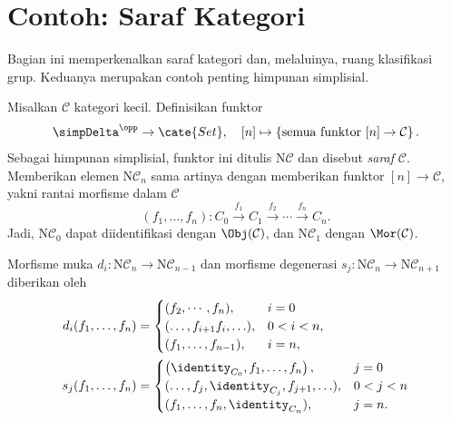 
\section{Contoh: Saraf Kategori}\label{sec:nerves}
\hypertarget{o014.aljabr2.chapter8.nerves-of-categories}{ }
Bagian ini memperkenalkan saraf kategori dan, melaluinya, ruang klasifikasi
grup. Keduanya merupakan contoh penting himpunan simplisial.

\begin{example}\label{eg:nerve-cat}
	Misalkan $\mathcal{C}$ kategori kecil. Definisikan funktor
	\[ \simpDelta^{\opp} \to \cate{Set}, \quad [n] \mapsto \left\{ \text{semua funktor } [n] \to \mathcal{C} \right\}. \]
	Sebagai himpunan simplisial, funktor ini ditulis
	$\mathrm{N}\mathcal{C}$ dan disebut \emph{saraf} $\mathcal{C}$. Memberikan
	elemen $\mathrm{N}\mathcal{C}_n$ sama artinya dengan memberikan funktor
	$[n]\to\mathcal{C}$, yakni rantai morfisme dalam $\mathcal{C}$
	\[ (f_1, \ldots, f_n): C_0 \xrightarrow{f_1} C_1 \xrightarrow{f_2} \cdots \xrightarrow{f_n} C_n. \]
	Jadi, $\mathrm{N}\mathcal{C}_0$ dapat diidentifikasi dengan
	$\Obj(\mathcal{C})$, dan $\mathrm{N}\mathcal{C}_1$ dengan
	$\Mor(\mathcal{C})$.

	Morfisme muka $d_i:\mathrm{N}\mathcal{C}_n\to
	\mathrm{N}\mathcal{C}_{n-1}$ dan morfisme degenerasi
	$s_j:\mathrm{N}\mathcal{C}_n\to\mathrm{N}\mathcal{C}_{n+1}$ diberikan
	oleh
	\begin{align*}
		d_i(f_1, \ldots, f_n) & = \begin{cases}
			(f_2, \cdots, f_n), & i = 0 \\
			(\ldots, f_{i+1} f_i, \ldots), & 0 < i < n, \\
			(f_1, \ldots, f_{n-1}), & i = n,
		\end{cases} \\
		s_j(f_1, \ldots, f_n) & = \begin{cases}
			\left( \identity_{C_0}, f_1, \ldots, f_n \right), & j = 0 \\
			(\ldots, f_j, \identity_{C_j}, f_{j+1}, \ldots ), & 0 < j < n \\
			(f_1, \ldots, f_n, \identity_{C_n}), & j = n.
		\end{cases}
	\end{align*}
\end{example}

